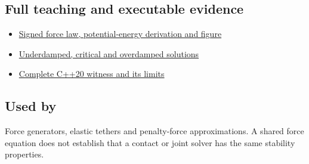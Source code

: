 \subsection{Full teaching and executable evidence}\label{appendix-e040e2108923-full-teaching-and-executable-evidence}

\hypertarget{appendix-e040e2108923-full-teaching-and-executable-evidence}{}

\begin{itemize}
\tightlist
\item
  \hyperref[06-engine-ii-ch047-a-spring-law-is-signed-not-just-a-magnitude]{Signed force law, potential-energy derivation and figure}
\item
  \hyperref[06-engine-ii-ch047-solve-each-linear-damping-regime-with-its-own-form]{Underdamped, critical and overdamped solutions}
\item
  \hyperref[06-engine-ii-ch047-standalone-spring-direction-and-integration-order-laboratory]{Complete C++20 witness and its limits}
\end{itemize}

\subsection{Used by}\label{appendix-e040e2108923-used-by}

\hypertarget{appendix-e040e2108923-used-by}{}

Force generators, elastic tethers and penalty-force approximations. A shared force equation does not establish that a contact or joint solver has the same stability properties.
